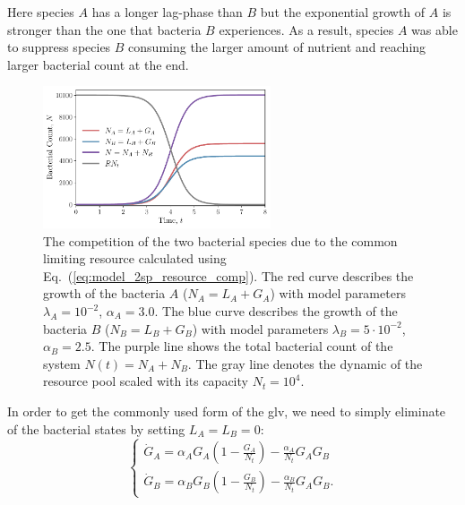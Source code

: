 \documentclass[10pt,A4paper]{article}
\numberwithin{equation}{section}
\begin{document}
Here species $A$ has a longer lag-phase than $B$ but the exponential growth of $A$ is stronger than the one that bacteria $B$ experiences.
As a result, species $A$ was able to suppress species $B$ consuming the larger amount of nutrient and reaching larger bacterial count at the end.
\begin{figure}[H]
    \begin{center}
    \includegraphics[width=0.6\textwidth]{Figures/pool_model_2pools_resource_competition.pdf}
    \caption{
        The competition of the two bacterial species due to the common limiting resource calculated using Eq.~(\ref{eq:model_2sp_resource_comp}).
        The red curve describes the growth of the bacteria $A$ ($N_A = L_A+G_A$) with model parameters $\lambda_A=10^{-2}$, $\alpha_A=3.0$.
        The blue curve describes the growth of the bacteria $B$ ($N_B = L_B+G_B$) with model parameters $\lambda_B=5\cdot 10^{-2}$, $\alpha_B=2.5$.
        The purple line shows the total bacterial count of the system  $N(t)=N_A+N_B$.
        The gray line denotes the dynamic of the resource pool scaled with its capacity $N_t=10^4$.
    }
    \label{fig:2pool_resource_2sp}
    \end{center}
\end{figure}
%
In order to get the commonly used form of the \ac{glv}, we need to simply eliminate of the bacterial states by setting $L_A=L_B=0$:
\begin{equation}
    \begin{cases}
    \dot{G}_A = \alpha_A G_A\left(1 - \frac{G_A}{N_t}\right) - \frac{\alpha_A}{N_t}G_AG_B\\
    \dot{G}_B = \alpha_B G_B\left(1-\frac{G_B}{N_t}\right) -\frac{\alpha_B}{N_t}G_AG_B. 
    \label{eq:LV_simple}
    \end{cases}
\end{equation}
\end{document}
